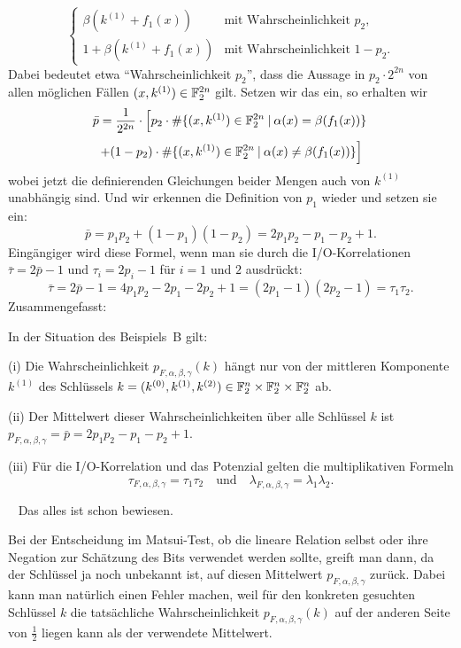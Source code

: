 \begin{refsegment}
\[\begin{cases}
           \beta(k^{(1)} + f_1(x))     & \text{mit Wahrscheinlichkeit } p_2, \\
           1 + \beta(k^{(1)} + f_1(x)) & \text{mit Wahrscheinlichkeit } 1 - p_2.
        \end{cases}
\]
Dabei bedeutet etwa "`Wahrscheinlichkeit $p_2$"', dass die Aussage in
$p_2 \cdot 2^{2n}$ von allen möglichen Fällen $(x,k^{(1)}) \in \mathbb{F}_2^{2n}$
gilt. Setzen wir das ein, so erhalten wir
\[
     \bar{p} = \frac{1}{2^{2n}}\cdot \left[
        p_2 \cdot \#\{(x,k^{(1)}) \in \mathbb{F}_2^{2n} \:|\: \alpha(x) = \beta(f_1(x))\} \right.
\]\[
     \left. + (1 -p_2) \cdot \#\{(x,k^{(1)}) \in \mathbb{F}_2^{2n} \:|\: \alpha(x) \neq \beta(f_1(x))\}
     \right]
\]
wobei jetzt die definierenden Gleichungen beider Mengen auch von $k^{(1)}$ unabhängig sind.
Und wir erkennen die Definition von $p_1$ wieder und setzen sie ein:
\[
     \bar{p} = p_1 p_2 + (1-p_1)(1-p_2) = 2 p_1 p_2 - p_1 - p_2 + 1.
\]
Eingängiger wird diese Formel, wenn man sie durch die
I/O-Korrelationen
$\bar{\tau} = 2 \bar{p} - 1$ und $\tau_i = 2p_i-1$ für $i = 1$ und $2$
ausdrückt:
\[
     \bar{\tau} = 2 \bar{p} - 1 = 4 p_1 p_2 - 2p_1 - 2p_2 + 1
      = (2p_1-1)(2p_2-1) = \tau_1 \tau_2.
\]
Zusammengefasst:
\begin{satz}\label{thm-bool-2rnd}
   In der Situation des Beispiels~B gilt:

   {\rm (i)} Die Wahrscheinlichkeit $p_{F,\alpha,\beta,\gamma}(k)$
   hängt nur von der mittleren Komponente $k^{(1)}$ des Schlüssels
   $k = (k^{(0)},k^{(1)},k^{(2)}) \in \mathbb{F}_2^n \times \mathbb{F}_2^n \times \mathbb{F}_2^n$ ab.

   {\rm (ii)} Der Mittelwert dieser Wahrscheinlichkeiten über alle Schlüssel
   $k$ ist $p_{F,\alpha,\beta,\gamma} = \bar{p} = 2 p_1 p_2 - p_1 - p_2 + 1$.

   {\rm (iii)} Für die I/O-Korrelation und das
   Potenzial gelten die multiplikativen Formeln
\[
     \tau_{F,\alpha,\beta,\gamma} = \tau_1 \tau_2 \quad \text{und} \quad
     \lambda_{F,\alpha,\beta,\gamma} = \lambda_1 \lambda_2.
\]
\end{satz}
\begin{Beweis} ~
   Das alles ist schon bewiesen.
\end{Beweis}

Bei der Entscheidung im Matsui-Test, ob die
lineare Relation selbst oder
ihre Negation zur Schätzung des Bits verwendet werden sollte, greift man
dann, da der Schlüssel ja noch unbekannt ist, auf diesen Mittelwert
$p_{F,\alpha,\beta,\gamma}$
zurück. Dabei kann man natürlich einen Fehler machen, weil für den
konkreten gesuchten Schlüssel $k$ die tatsächliche Wahrscheinlichkeit
$p_{F,\alpha,\beta,\gamma}(k)$ auf der anderen Seite von $\frac{1}{2}$
liegen kann als der verwendete Mittelwert.


\end{refsegment}
